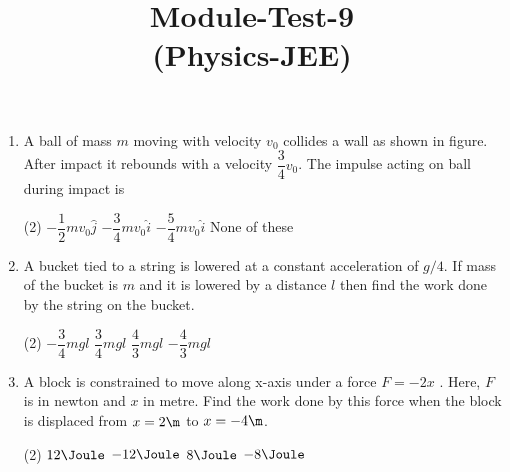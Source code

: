 \documentclass{article}
\title{Module-Test-9\\(Physics-JEE)}
\begin{document}
\maketitle

\jeeSectionA

\begin{enumerate}
\item A ball of mass $m$ moving with velocity $v_0$ collides a wall as shown in figure. After impact it rebounds with a velocity $\dfrac{3}{4}v_0$. The impulse acting on ball during impact is
\begin{center}
\end{center}
\begin{tasks}(2)
	\task $-\dfrac{1}{2}mv_0\hat{j}$
	\task $-\dfrac{3}{4}mv_0\hat{i}$
	\task $-\dfrac{5}{4}mv_0\hat{i}$\ans
	\task None of these
\end{tasks}

\item A bucket tied to a string is lowered at a constant acceleration of $g/4$. If mass of the bucket is $m$ and it is lowered by a distance $l$ then find the work done by the string on the bucket.
\begin{tasks}(2)
	\task $-\dfrac{3}{4}mgl$\ans
	\task $\dfrac{3}{4}mgl$
	\task $\dfrac{4}{3}mgl$
	\task $-\dfrac{4}{3}mgl$
\end{tasks}

\item A block is constrained to move along x-axis under a force $F = - 2x$ . Here, $F$ is in newton and $x$ in
metre. Find the work done by this force when the block is displaced from $x = 2 \m$ to $x = - 4 \m$.
\begin{center}
\end{center}
\begin{tasks}(2)
	\task $12\Joule$
	\task $-12\Joule$\ans
	\task $8\Joule$
	\task $-8\Joule$
\end{tasks}


\end{enumerate}
\end{document}
